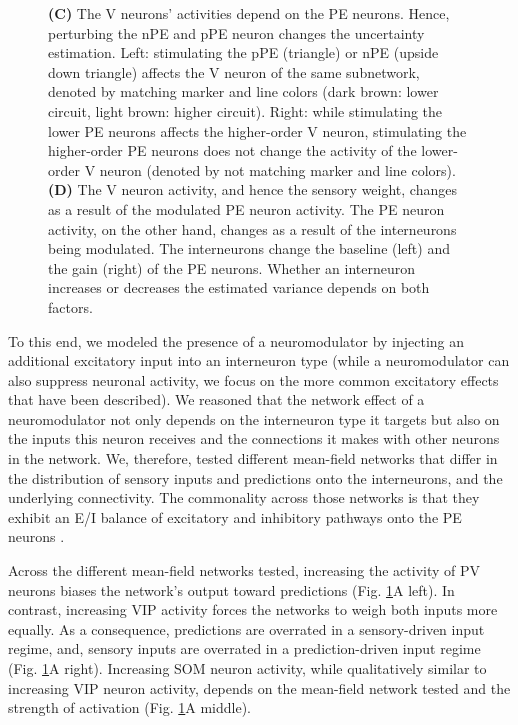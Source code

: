 \documentclass[10pt,a4paper]{article}
\begin{document}
\begin{figure}[t!]
{{\bf (C)} The V neurons' activities depend on the PE neurons. Hence, perturbing the nPE and pPE neuron changes the uncertainty estimation. Left: stimulating the pPE (triangle) or nPE (upside down triangle) affects the V neuron of the same subnetwork, denoted by matching marker and line colors (dark brown: lower circuit, light brown: higher circuit). Right: while stimulating the lower PE neurons affects the higher-order V neuron, stimulating the higher-order PE neurons does not change the activity of the lower-order V neuron (denoted by not matching marker and line colors).
{\bf (D)} The V neuron activity, and hence the sensory weight, changes as a result of the modulated PE neuron activity. The PE neuron activity, on the other hand, changes as a result of the interneurons being modulated. The interneurons change the baseline (left) and the gain (right) of the PE neurons. Whether an interneuron increases or decreases the estimated variance depends on both factors.
}
\label{fig:Fig_4}
\end{figure}
%

To this end, we modeled the presence of a neuromodulator by injecting an additional excitatory input into an interneuron type (while a neuromodulator can also suppress neuronal activity, we focus on the more common excitatory effects that have been described). We reasoned that the network effect of a neuromodulator not only depends on the interneuron type it targets but also on the inputs this neuron receives and the connections it makes with other neurons in the network. We, therefore, tested different mean-field networks that differ in the distribution of sensory inputs and predictions onto the interneurons, and the underlying connectivity. The commonality across those networks is that they exhibit an E/I balance of excitatory and inhibitory pathways onto the PE neurons \citep{hertag2022prediction}. 

Across the different mean-field networks tested, increasing the activity of PV neurons biases the network's output toward predictions (Fig. \ref{fig:Fig_4}A left). In contrast, increasing VIP activity forces the networks to weigh both inputs more equally. As a consequence, predictions are overrated in a sensory-driven input regime, and, sensory inputs are overrated in a prediction-driven input regime (Fig. \ref{fig:Fig_4}A right). Increasing SOM neuron activity, while qualitatively similar to increasing VIP neuron activity, depends on the mean-field network tested and the strength of activation (Fig. \ref{fig:Fig_4}A middle). 
\end{document}
